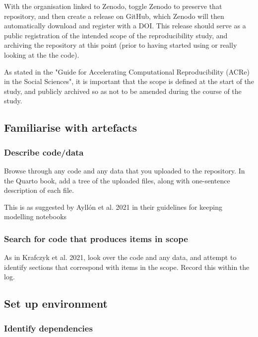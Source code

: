 With the organisation linked to Zenodo, toggle Zenodo to preserve that repository, and then create a release on GitHub, which Zenodo will then automatically download and register with a DOI. This release should serve as a public registration of the intended scope of the reproducibility study, and archiving the repository at this point (prior to having started using or really looking at the the code).

As stated in the "Guide for Accelerating Computational Reproducibility (ACRe) in the Social Sciences", it is important that the scope is defined at the start of the study, and publicly archived so as not to be amended during the course of the study.\cite{berkeley_initiative_for_transparency_in_the_social_sciences_guide_2022}

\subsection{Familiarise with artefacts}

\subsubsection{Describe code/data}
\timeyes

Browse through any code and any data that you uploaded to the repository. In the Quarto book, add a tree of the uploaded files, along with one-sentence description of each file.

This is as suggested by Ayllón et al. 2021\autocite{ayllon_keeping_2021} in their guidelines for keeping modelling notebooks

\subsubsection{Search for code that produces items in scope}
\timeyes

As in Krafczyk et al. 2021,\cite{krafczyk_learning_2021} look over the code and any data, and attempt to identify sections that correspond with items in the scope. Record this within the log.

\subsection{Set up environment}

\subsubsection{Identify dependencies}
\timeyes

